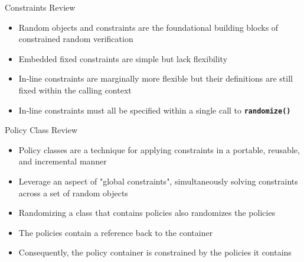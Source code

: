 \documentclass[aspectratio=169]{beamer}
\newcommand{\code}[1]{
  \textbf{\texttt{#1}}
}
\begin{document}
\begin{frame}
\end{frame}

\begin{frame}{Constraints Review}
  \begin{itemize}
    \item Random objects and constraints are the foundational building blocks of constrained random verification
    \item Embedded fixed constraints are simple but lack flexibility
    \item In-line constraints are marginally more flexible but their definitions are still fixed within the calling context
    \item In-line constraints must all be specified within a single call to \code{randomize()} 
  \end{itemize}
\end{frame}

\begin{frame}{Policy Class Review}
  \begin{itemize}
    \item Policy classes are a technique for applying constraints in a portable, reusable, and incremental manner
    \item Leverage an aspect of "global constraints", simultaneously solving constraints across a set of random objects
    \item Randomizing a class that contains policies also randomizes the policies
    \item The policies contain a reference back to the container
    \item Consequently, the policy container is constrained by the policies it contains
  \end{itemize}
\end{frame}
\end{document}

